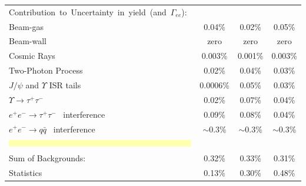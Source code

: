 \begin{minipage}{6in}
\begin{minipage}{\linewidth}
\begin{tabular}{p{4.5cm} c c c}
    \mbox{\LARGE Contribution to Uncertainty in yield (and $\Gamma_{ee}$):} & & & \vspace{0.2cm} \\
    Beam-gas & 0.04\% & 0.02\% & 0.05\% \vspace{0.1cm} \\
    Beam-wall & zero & zero & zero \vspace{0.1cm} \\
    Cosmic Rays & 0.003\% & 0.001\% & 0.003\% \vspace{0.1cm} \\
    Two-Photon Process & 0.02\% & 0.04\% & 0.03\% \vspace{0.1cm} \\
    $J/\psi$ and $\Upsilon$ ISR tails & 0.0006\% & 0.05\% & 0.03\% \vspace{0.1cm} \\
    $\Upsilon \to \tau^+ \tau^-$ & 0.02\% & 0.07\% & 0.04\% \vspace{0.1cm} \\
    \raggedright $e^+ e^- \to \tau^+ \tau^-$ \mbox{\hspace{0.65cm} interference} & 0.09\% & 0.08\% & 0.04\% \vspace{0.1cm} \\
    \raggedright $e^+ e^- \to q\bar{q}$ \mbox{\hspace{0.65cm} interference} & $\sim$0.3\% & $\sim$0.3\% & $\sim$0.3\% \vspace{0.1cm} \\\hline
    \mbox{\hspace{-0.1cm}\includegraphics[width=15.5cm]{pivarski2.eps}} & & & \vspace{-0.85cm} \vspace{0.1cm} \\
    Sum of Backgrounds: & 0.32\% & 0.33\% & 0.31\% \vspace{0.5cm} \vspace{0.1cm} \\

    Statistics & 0.13\% & 0.30\% & 0.48\% \vspace{0.5cm} \vspace{0.1cm} \\


\end{tabular}
\end{minipage}
\end{minipage}
